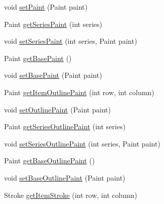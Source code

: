 \begin{DoxyCompactItemize}
\item 
void \mbox{\hyperlink{interfaceorg_1_1jfree_1_1chart_1_1renderer_1_1category_1_1_category_item_renderer_ae7591853d51daf28fef33c95c52c6b50}{set\+Paint}} (Paint paint)
\item 
Paint \mbox{\hyperlink{interfaceorg_1_1jfree_1_1chart_1_1renderer_1_1category_1_1_category_item_renderer_a43c98426743800cd392cc9e19b865c67}{get\+Series\+Paint}} (int series)
\item 
void \mbox{\hyperlink{interfaceorg_1_1jfree_1_1chart_1_1renderer_1_1category_1_1_category_item_renderer_a5e1be0451c25f554cca76cceaa5a3785}{set\+Series\+Paint}} (int series, Paint paint)
\item 
Paint \mbox{\hyperlink{interfaceorg_1_1jfree_1_1chart_1_1renderer_1_1category_1_1_category_item_renderer_a4ec9128f95f8accf841ecf3d804bc04f}{get\+Base\+Paint}} ()
\item 
void \mbox{\hyperlink{interfaceorg_1_1jfree_1_1chart_1_1renderer_1_1category_1_1_category_item_renderer_a077f331549f2d9a83380ad763d03f3a6}{set\+Base\+Paint}} (Paint paint)
\item 
Paint \mbox{\hyperlink{interfaceorg_1_1jfree_1_1chart_1_1renderer_1_1category_1_1_category_item_renderer_a94559ebbf9eafc0fe7a6291e9be3136a}{get\+Item\+Outline\+Paint}} (int row, int column)
\item 
void \mbox{\hyperlink{interfaceorg_1_1jfree_1_1chart_1_1renderer_1_1category_1_1_category_item_renderer_a119d91fd06285d9c41b599e92f9a3178}{set\+Outline\+Paint}} (Paint paint)
\item 
Paint \mbox{\hyperlink{interfaceorg_1_1jfree_1_1chart_1_1renderer_1_1category_1_1_category_item_renderer_a269a247e3438efdbf4f9620751e650e7}{get\+Series\+Outline\+Paint}} (int series)
\item 
void \mbox{\hyperlink{interfaceorg_1_1jfree_1_1chart_1_1renderer_1_1category_1_1_category_item_renderer_ad9d8d1de6d5a111e38ac539f8eb3e917}{set\+Series\+Outline\+Paint}} (int series, Paint paint)
\item 
Paint \mbox{\hyperlink{interfaceorg_1_1jfree_1_1chart_1_1renderer_1_1category_1_1_category_item_renderer_ac377433615b656ed7e80983b9ce9723f}{get\+Base\+Outline\+Paint}} ()
\item 
void \mbox{\hyperlink{interfaceorg_1_1jfree_1_1chart_1_1renderer_1_1category_1_1_category_item_renderer_a93943e70bb3fe40e631bcc25ac9201d7}{set\+Base\+Outline\+Paint}} (Paint paint)
\item 
Stroke \mbox{\hyperlink{interfaceorg_1_1jfree_1_1chart_1_1renderer_1_1category_1_1_category_item_renderer_a39dc7c77a9ebfb272e1d97e90914159b}{get\+Item\+Stroke}} (int row, int column)

\end{DoxyCompactItemize}
